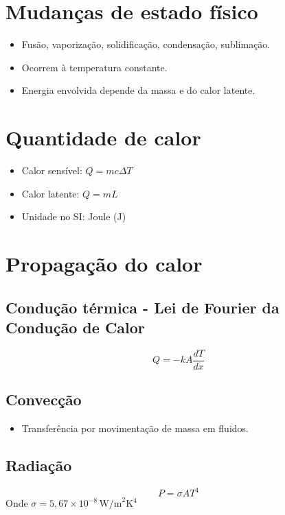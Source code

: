 \documentclass[a4paper,12pt]{article}
\begin{document}
\begin{multicols}{2}
\section{Mudanças de estado físico}
\begin{itemize}
    \item Fusão, vaporização, solidificação, condensação, sublimação.
    \item Ocorrem à temperatura constante.
    \item Energia envolvida depende da massa e do calor latente.
\end{itemize}

\section{Quantidade de calor}
\begin{itemize}
    \item Calor sensível: $Q = mc\Delta T$
    \item Calor latente: $Q = mL$
    \item Unidade no SI: Joule (J)
\end{itemize}

\section{Propagação do calor}
\subsection{Condução térmica -  Lei de Fourier da Condução de Calor}
\begin{equation}
\boxed{Q = -kA\frac{dT}{dx}}
\end{equation}

\subsection{Convecção}
\begin{itemize}
    \item Transferência por movimentação de massa em fluidos.
\end{itemize}

\subsection{Radiação}
\begin{equation}
    P = \sigma A T^4
\end{equation}
Onde $\sigma = 5{,}67 \times 10^{-8} \, \text{W/m}^2\text{K}^4$


\end{multicols}
\end{document}

